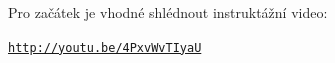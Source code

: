 Pro začátek je vhodné shlédnout instruktážní video: 
\begin{center}
	\href{http://youtu.be/4PxvWvTIyaU}{\texttt{http://youtu.be/4PxvWvTIyaU}}
\end{center}

\newpage






